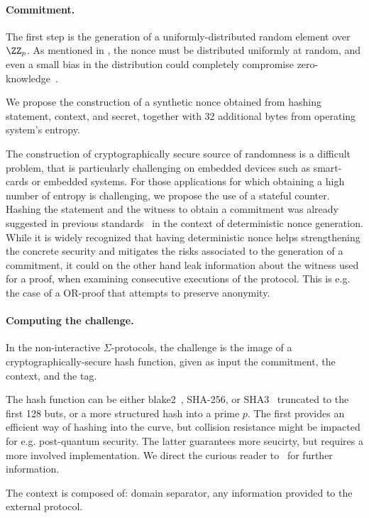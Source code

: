 \documentclass[runningheads]{llncs}
\begin{document}

\paragraph{Commitment.} The first step is the generation of a uniformly-distributed random element over $\ZZ_p$. As mentioned in , the nonce must be distributed uniformly at random, and even a small bias in the distribution could completely compromise zero-knowledge~\cite{XX}.

We propose the construction of a synthetic nonce obtained from hashing statement, context, and secret, together with 32 additional bytes from operating system's entropy.

The construction of cryptographically secure source of randomness is a difficult problem, that is particularly challenging on embedded devices such as smart-cards or embedded systems. For those applications for which obtaining a high number of entropy is challenging, we propose the use of a stateful counter.
Hashing the statement and the witness to obtain a commitment was already suggested in previous standards~\cite{rfc6979} in the context of deterministic nonce generation.
While it is widely recognized that having deterministic nonce helps strengthening the concrete security  and mitigates the risks associated to the generation of a commitment, it could on the other hand leak information about the witness used for a proof, when examining consecutive executions of the protocol. This is e.g. the case of a OR-proof that attempts to preserve anonymity.

\paragraph{Computing the challenge.} In the non-interactive $\Sigma$-protocols, the challenge is the image of a cryptographically-secure hash function,
given as input the commitment, the context, and the tag.

The hash function can be either blake2~\cite{XX}, SHA-256, or SHA3~\cite{XX} truncated to the first 128 buts, or a more structured hash into a prime $p$.
The first provides an efficient way of hashing into the curve, but collision resistance might be impacted for e.g. post-quantum security.
The latter guarantees more seucirty, but requires a more involved implementation.
We direct the curious reader to~\cite{XX} for further information.

The context is composed of: domain separator, any information provided to the external protocol.
\end{document}
